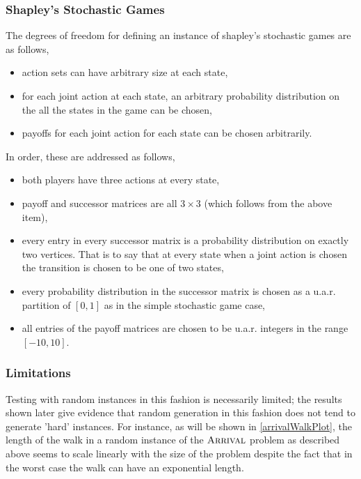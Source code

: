 \subsubsection{Shapley's Stochastic Games} \label{shapleyRandom}
The degrees of freedom for defining an instance of shapley's stochastic games are as follows,
\begin{itemize}
  \item action sets can have arbitrary size at each state,
  \item for each joint action at each state, an arbitrary probability distribution on the all
    the states in the game can be chosen,
  \item payoffs for each joint action for each state can be chosen arbitrarily.
\end{itemize}
In order, these are addressed as follows,
\begin{itemize}
  \item both players have three actions at every state,
  \item payoff and successor matrices are all $3 \times 3$ (which follows from the above item),
  \item every entry in every successor matrix is a probability distribution on exactly two vertices.
    That is to say that at every state when a joint action is chosen the transition is chosen
    to be one of two states,
  \item every probability distribution in the successor matrix is chosen as a u.a.r. partition of $[0, 1]$
    as in the simple stochastic game case,
  \item all entries of the payoff matrices are chosen to be u.a.r. integers in the range $[-10, 10]$.
\end{itemize}
\subsubsection{Limitations}
Testing with random instances in this fashion is necessarily limited; the results
shown later give evidence that random generation in this fashion does not tend to generate 'hard' instances.
For instance, as will be shown in \cref{arrivalWalkPlot}, the length of the walk in a random instance
of the $\textsc{Arrival}$ problem as described above seems to scale linearly with the size of the problem despite
the fact that in the worst case the walk can have an exponential length. 
